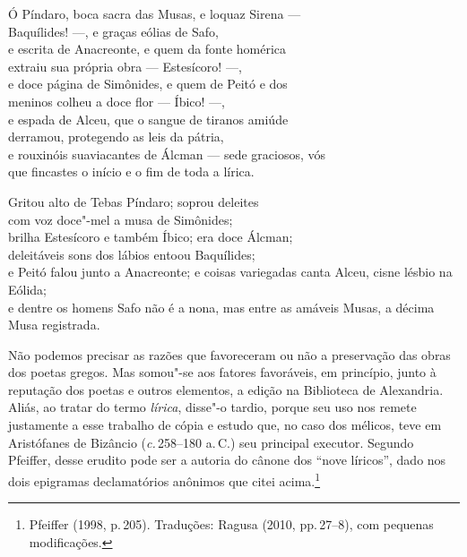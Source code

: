 {\setlength{\epigraphwidth}{.7\textwidth}
\epigraph{Ó Píndaro, boca sacra das Musas, e loquaz Sirena --- \\
Baquílides! ---, e graças eólias de Safo, \\
e escrita de Anacreonte, e quem da fonte homérica \\
extraiu sua própria obra --- Estesícoro! ---, \\
e doce página de Simônides, e quem de Peitó\footnotemark{} e dos \\
meninos colheu a doce flor --- Íbico! ---, \\
e espada de Alceu, que o sangue de tiranos amiúde \\
derramou, protegendo as leis da pátria, \\
e rouxinóis suaviacantes de Álcman --- sede \qb{}graciosos, vós \\
que fincastes o início e o fim de toda a lírica.\footnotemark{} \\ 

\medskip

Gritou alto de Tebas Píndaro; soprou deleites \\
com voz doce"-mel a musa de Simônides; \\
brilha Estesícoro e também Íbico; era doce Álcman; \\
deleitáveis sons dos lábios entoou Baquílides; \\
e Peitó falou junto a Anacreonte; e coisas variegadas canta Alceu, cisne lésbio na Eólida; \\
e dentre os homens Safo não é a nona, mas entre as amáveis Musas, a décima Musa registrada.\footnotemark}{}
}

\setcounter{footnote}{141}

\setcounter{footnote}{142}

\setcounter{footnote}{143}

\noindent{}Não podemos precisar as razões que favoreceram ou não a
preservação das obras dos poetas gregos. Mas somou"-se aos fatores favoráveis,
em princípio, junto à reputação dos poetas e outros elementos, a edição na
Biblioteca de Alexandria. Aliás, ao tratar do termo \emph{lírica}, disse"-o
tardio, porque seu uso nos remete justamente a esse trabalho de cópia e estudo
que, no caso dos mélicos, teve em Aristófanes de Bizâncio
(\emph{c.}\,258--180 a.\,C.) seu principal executor. Segundo Pfeiffer, desse
erudito pode ser a autoria do cânone dos “nove líricos”,
dado nos dois epigramas declamatórios anônimos que citei
acima.\footnote{Pfeiffer (1998, p.\,205). Traduções: Ragusa (2010, pp.\,27--8), com pequenas modificações.}

